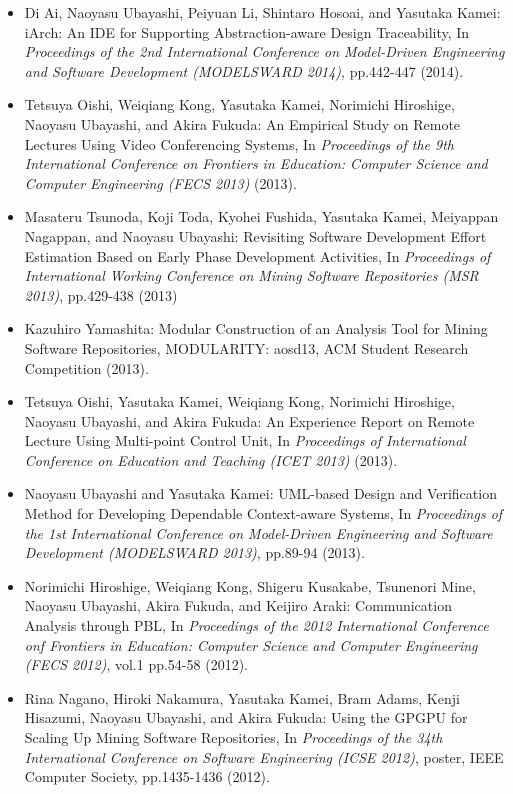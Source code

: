 \documentclass{article}
\begin{document}
\begin{itemize}
\item Di Ai, Naoyasu Ubayashi, Peiyuan Li, Shintaro Hosoai, and Yasutaka Kamei:
iArch: An IDE for Supporting Abstraction-aware Design Traceability,
In {\em Proceedings of the 2nd International Conference on Model-Driven Engineering and Software Development (MODELSWARD 2014)},
pp.442-447 (2014).

\item Tetsuya Oishi, Weiqiang Kong, Yasutaka Kamei, Norimichi Hiroshige, Naoyasu Ubayashi, and Akira Fukuda:
An Empirical Study on Remote Lectures Using Video Conferencing Systems,
In {\em Proceedings of the 9th International Conference on Frontiers in Education: Computer Science and Computer Engineering  (FECS 2013)} (2013).

\item Masateru Tsunoda, Koji Toda, Kyohei Fushida, Yasutaka Kamei, Meiyappan Nagappan, and Naoyasu Ubayashi:
Revisiting Software Development Effort Estimation Based on Early Phase Development Activities,
In {\em Proceedings of International Working Conference on Mining Software Repositories (MSR 2013)}, pp.429-438 (2013)

\item Kazuhiro Yamashita:
Modular Construction of an Analysis Tool for Mining Software Repositories,
MODULARITY: aosd13, ACM Student Research Competition (2013).

\item Tetsuya Oishi, Yasutaka Kamei, Weiqiang Kong, Norimichi Hiroshige, Naoyasu Ubayashi, and Akira Fukuda:
An Experience Report on Remote Lecture Using Multi-point Control Unit,
In {\em Proceedings of International Conference on Education and Teaching (ICET 2013)} (2013).

\item Naoyasu Ubayashi and Yasutaka Kamei:
UML-based Design and Verification Method for Developing Dependable Context-aware Systems,
In {\em Proceedings of the 1st International Conference on Model-Driven Engineering and Software Development (MODELSWARD 2013)},
pp.89-94 (2013).

\item Norimichi Hiroshige, Weiqiang Kong, Shigeru Kusakabe, Tsunenori Mine, Naoyasu Ubayashi, Akira Fukuda, and Keijiro Araki:
Communication Analysis through PBL,
In {\em Proceedings of the 2012 International Conference onf Frontiers in Education: Computer Science and Computer Engineering (FECS 2012)},
vol.1 pp.54-58 (2012).

\item Rina Nagano, Hiroki Nakamura, Yasutaka Kamei, Bram Adams, Kenji Hisazumi, Naoyasu Ubayashi, and Akira Fukuda:
Using the GPGPU for Scaling Up Mining Software Repositories,
In {\em Proceedings of the 34th International Conference on Software Engineering (ICSE 2012)}, poster,
IEEE Computer Society, pp.1435-1436 (2012).


\end{itemize}
\end{document}
